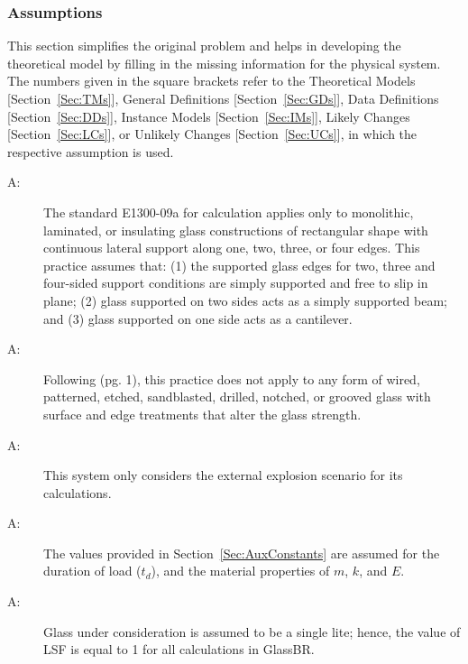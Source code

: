 \documentclass[12pt]{article}
\newcounter{assumpnum}
\newcommand{\atheassumpnum}{A\theassumpnum}
\begin{document}
\subsubsection{Assumptions}
\label{Sec:Assumps}
This section simplifies the original problem and helps in developing the theoretical model by filling in the missing information for the physical system. The numbers given in the square brackets refer to the Theoretical Models {[}Section~\ref{Sec:TMs}{]}, General Definitions {[}Section~\ref{Sec:GDs}{]}, Data Definitions {[}Section~\ref{Sec:DDs}{]}, Instance Models {[}Section~\ref{Sec:IMs}{]}, Likely Changes {[}Section~\ref{Sec:LCs}{]}, or Unlikely Changes {[}Section~\ref{Sec:UCs}{]}, in which the respective assumption is used.
\begin{description}
\item[\atheassumpnum\label{A:glassType}:]The standard E1300-09a for calculation applies only to monolithic, laminated, or insulating glass constructions of rectangular shape with continuous lateral support along one, two, three, or four edges. This practice assumes that: (1) the supported glass edges for two, three and four-sided support conditions are simply supported and free to slip in plane; (2) glass supported on two sides acts as a simply supported beam; and (3) glass supported on one side acts as a cantilever.
\end{description}
\begin{description}
\item[\atheassumpnum\label{A:glassCondition}:]Following \cite{astm2009} (pg. 1), this practice does not apply to any form of wired, patterned, etched, sandblasted, drilled, notched, or grooved glass with surface and edge treatments that alter the glass strength.
\end{description}
\begin{description}
\item[\atheassumpnum\label{A:explainScenario}:]This system only considers the external explosion scenario for its calculations.
\end{description}
\begin{description}
\item[\atheassumpnum\label{A:standardValues}:]The values provided in Section~\ref{Sec:AuxConstants} are assumed for the duration of load (${t_{d}}$), and the material properties of $m$, $k$, and $E$.
\end{description}
\begin{description}
\item[\atheassumpnum\label{A:glassLite}:]Glass under consideration is assumed to be a single lite; hence, the value of LSF is equal to 1 for all calculations in GlassBR.
\end{description}
\end{document}
